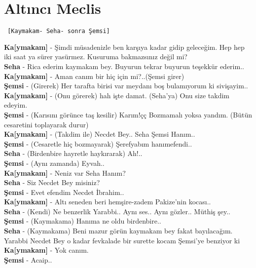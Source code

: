 \documentclass[]{book}
\begin{document}
\hypertarget{altinci-meclis-1}{%
\section{Altıncı Meclis}\label{altinci-meclis-1}}

\begin{verbatim}
 [Kaymakam- Seha- sonra Şemsi]
\end{verbatim}

\textbf{Ka{[}ymakam{]}} - Şimdi müsadenizle ben karşıya kadar gidip geleceğim. Hep hep iki saat ya sürer yasürmez. Kusuruma bakmazsınız değil mi?\\
\textbf{Seha} - Rica ederim kaymakam bey. Buyurun tekrar buyurun teşekkür ederim..\\
\textbf{Ka{[}ymakam{]}} - Aman canım bir hiç için mi?..(Şemsi girer)\\
\textbf{Şemsi} - (Girerek) Her tarafta birisi var meydanı boş bulamıyorum ki sivişayim..\\
\textbf{Ka{[}ymakam{]}} - (Onu görerek) hah işte damat. (Seha'ya) Onu size takdim edeyim.\\
\textbf{Şemsi} - (Karısını görünce taş kesilir) Karım!çç Bozmamalı yoksa yandım. (Bütün cesaretini toplayarak durur)\\
\textbf{Ka{[}ymakam{]}} - (Takdim ile) Necdet Bey.. Seha Şemsi Hanım..\\
\textbf{Şemsi} - (Cesaretle hiç bozmayarak) Şerefyabım hanımefendi..\\
\textbf{Seha} - (Birdenbire hayretle haykırarak) Ah!..\\
\textbf{Şemsi} - (Aynı zamanda) Eyvah..\\
\textbf{Ka{[}ymakam{]}} - Neniz var Seha Hanım?\\
\textbf{Seha} - Siz Necdet Bey misiniz?\\
\textbf{Şemsi} - Evet efendim Necdet İbrahim..\\
\textbf{Ka{[}ymakam{]}} - Altı seneden beri hemşire-zadem Pakize'nin kocası..\\
\textbf{Seha} - (Kendi) Ne benzerlik Yarabbi.. Aynı ses.. Aynı gözler.. Müthiş şey..\\
\textbf{Şemsi} - (Kaymakama) Hanıma ne oldu birdenbire..\\
\textbf{Seha} - (Kaymakama) Beni mazur görün kaymakam bey fakat bayılacağım. Yarabbi Necdet Bey o kadar fevkalade bir surette kocam Şemsi'ye benziyor ki\\
\textbf{Ka{[}ymakam{]}} - Yok canım.\\
\textbf{Şemsi} - Acaip..\\
\end{document}
